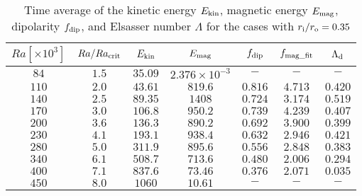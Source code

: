  \begin{table}
 \begin{center}
\caption{Time average of the kinetic energy $E_{\rm kin}$, magnetic energy $E_{\rm mag}$, dipolarity $f_{\rm dip}$, and Elsasser number $\Lambda$ for the cases with $r_{\rm i}/r_{\rm o} = 0.35$}
  \begin{tabular}{ccccccc}
    \hline
     $Ra[\times 10^3]$  &  $Ra/Ra_{\rm crit}$&  $E_{\rm kin}$  &  $E_{\rm mag}$ & $f_{\rm dip}$ & $f_{\rm mag\_fit}$ & $\Lambda_{\rm d}$\\
    \hline \hline
      $84$    & $1.5$ &  $35.09$ & $2.376 \times 10^{-3}$ & $-$ & $-$ & $-$\\
     $110$  & $2.0$ &  $43.61$ & $819.6$ & $0.816$ & $4.713$ & $0.420$\\
     $140$  & $2.5$ &  $89.35$ & $1408$ & $0.724$ & $3.174$ & $0.519$\\
     $170$  & $3.0$ &  $106.8$ & $950.2$ & $0.739$ & $4.239$ & $0.407$\\
     $200$  & $3.6$ &  $136.3$ & $890.2$ & $0.692$ & $3.900$ & $0.399$\\
     $230$  & $4.1$ &  $193.1$ & $938.4$ & $0.632$ & $2.946$ & $0.421$\\
     $280$  & $5.0$ &  $311.9$ & $895.6$ & $0.556$ & $2.848$ & $0.383$\\
     $340$  & $6.1$ &  $508.7$ & $713.6$ & $0.480$ & $2.006$ & $0.294$\\
     $400$  & $7.1$ &  $837.6$ & $73.46$ & $0.376$ & $2.071$ & $0.035$\\
     $450$  & $8.0$ &  $1060$ & $10.61$ & $-$ & $-$ & $-$\\
    \hline
  \end{tabular}
 \end{center}
\label{table:Summary_35}
 \end{table}
%
%
%

